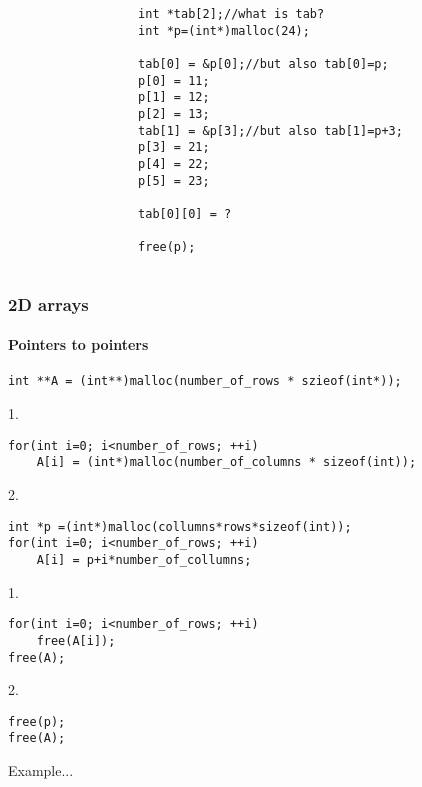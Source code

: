 \documentclass[10pt]{beamer}
\begin{document}
\begin{frame}[fragile]
\begin{columns}
\begin{column}{0.65\textwidth}
    \end{column}
    \begin{column}{0.55\textwidth}

\begin{lstlisting}
int *tab[2];//what is tab?
int *p=(int*)malloc(24);

tab[0] = &p[0];//but also tab[0]=p;
p[0] = 11;
p[1] = 12;
p[2] = 13;
tab[1] = &p[3];//but also tab[1]=p+3;
p[3] = 21;
p[4] = 22;
p[5] = 23;

tab[0][0] = ?

free(p);
\end{lstlisting}

    \end{column}
  \end{columns}
\end{frame}

\begin{frame}[fragile]
  \frametitle{2D arrays}
  \framesubtitle{Pointers to pointers}  
  \vspace{-0.3cm}

\begin{lstlisting}
int **A = (int**)malloc(number_of_rows * szieof(int*));
\end{lstlisting}

1.
\begin{lstlisting}
for(int i=0; i<number_of_rows; ++i)
	A[i] = (int*)malloc(number_of_columns * sizeof(int));
\end{lstlisting}

2.
\begin{lstlisting}
int *p =(int*)malloc(collumns*rows*sizeof(int));
for(int i=0; i<number_of_rows; ++i)
	A[i] = p+i*number_of_collumns;
\end{lstlisting}

1.
\begin{lstlisting}
for(int i=0; i<number_of_rows; ++i)
	free(A[i]);
free(A);
\end{lstlisting}

2.
\begin{lstlisting}
free(p);
free(A);
\end{lstlisting}

Example...

\end{frame}
\end{document}
